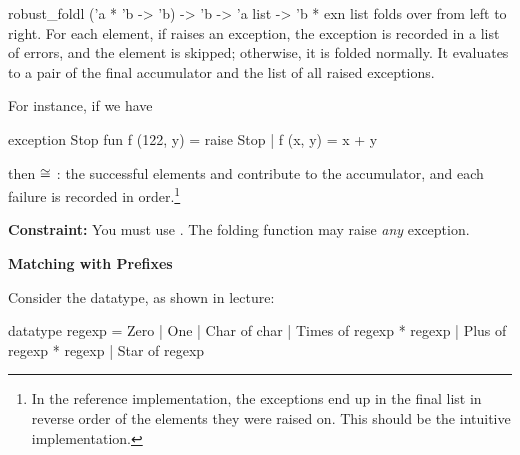 \documentclass[addpoints,12pt, answers]{exam}
\newenvironment{constraint}{\color{constraint_color}\textbf{Constraint:}}{}
\begin{document}
\begin{questions}
\spec
  {robust_foldl}
  {('a * 'b -> 'b) -> 'b -> 'a list -> 'b * exn list}
  {}
  { folds  over  from left to right.
  For each element, if  raises an exception, the exception is recorded
  in a list of errors, and the element is skipped; otherwise, it is folded
  normally. It evaluates to a pair of the final accumulator and the list of all
  raised exceptions.}

For instance, if we have
\begin{codeblock}
    exception Stop
    fun f (122, y) = raise Stop
      | f (x, y) = x + y
\end{codeblock}
then  $\cong$ : the
successful elements  and  contribute to the accumulator, and
each failure is recorded in order.\footnote{In the reference implementation,
the exceptions end up in the final list in reverse order of the elements
they were raised on. This should be
the intuitive implementation.}

\begin{constraint}
  You must use . The folding function  may raise
  \textit{any} exception.
\end{constraint}


\newpage


\textbf{Matching with Prefixes}

Consider the  datatype, as shown in lecture:

\begin{codeblock}
  datatype regexp =
      Zero
    | One
    | Char of char
    | Times of regexp * regexp
    | Plus of regexp * regexp
    | Star of regexp
\end{codeblock}


\end{questions}
\end{document}
